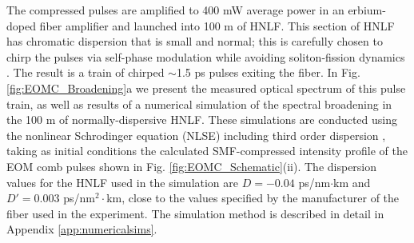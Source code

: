 The compressed pulses are amplified to 400 mW average power in an erbium-doped fiber amplifier and launched into 100 m of HNLF. This section of HNLF has chromatic dispersion that is small and normal; this is carefully chosen to chirp the pulses via self-phase modulation while avoiding soliton-fission dynamics \cite{Dudley2006}. The result is a train of chirped $\sim$1.5 ps pulses exiting the fiber.  In Fig. \ref{fig:EOMC_Broadening}a we present the measured optical spectrum of this pulse train, as well as results of a numerical simulation of the spectral broadening in the 100 m of normally-dispersive HNLF. These simulations are conducted using the nonlinear Schrodinger equation (NLSE) including third order dispersion \cite{Agrawal2007}, taking as initial conditions the calculated SMF-compressed intensity profile of the EOM comb pulses shown in Fig. \ref{fig:EOMC_Schematic}(ii). The dispersion values for the HNLF used in the simulation are $D=-0.04$  ps/nm$\cdot$km and $D'=0.003$ ps/nm$^2\cdot$km, close to the values specified by the manufacturer of the fiber used in the experiment. The simulation method is described in detail in Appendix \ref{app:numericalsims}.




